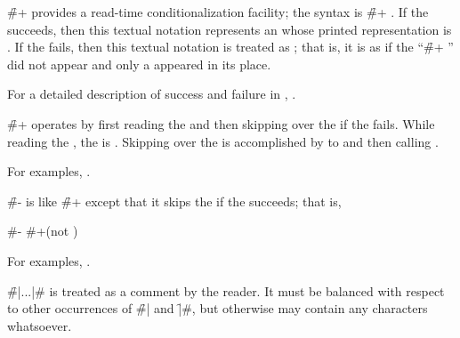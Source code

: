\endsubsubsection%



\f{\#+} provides a read-time conditionalization facility;
the syntax is \f{\#+ }.
If the   succeeds,
then this textual notation represents an 
 whose printed representation is .
If the   fails,
then this textual notation is treated as ; 
 that is, it is as if the ``\f{\#+}  '' 
 did not appear and only a  appeared in its place.

For a detailed description of success and failure in ,
\seesection\FeatureExpressions.

\f{\#+} operates by first reading the 
and then skipping over the  if the  fails.
While reading the , the  is .
Skipping over the  is accomplished by  
 to  and then calling .

For examples, \seesection\FeatureExpExamples.

\endsubsubsection%



\f{\#-} is like \f{\#+} 
except that it skips the  if the  succeeds; 
that is,

\code
#-  \EQ #+(not ) 
\endcode

For examples, \seesection\FeatureExpExamples.

\endsubsubsection%



\f{\#|...|\#} is treated as a comment by the reader.
It must be balanced with respect to other occurrences of \f{\#|} and \f{|\#},
but otherwise may contain any characters whatsoever.


